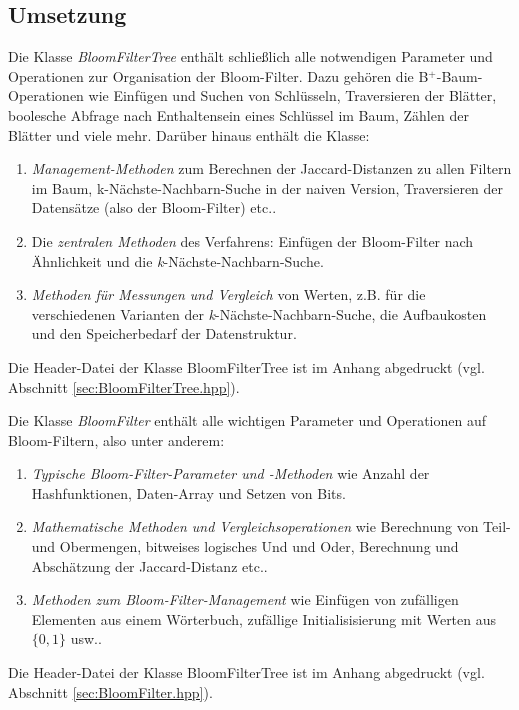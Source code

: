 \subsection{Umsetzung}\label{sec:umsetzung}
Die Klasse \textit{BloomFilterTree} enthält schließlich alle notwendigen Parameter und Operationen zur Organisation der Bloom-Filter. Dazu gehören die B$^+$-Baum-Operationen wie Einfügen und Suchen von Schlüsseln, Traversieren der Blätter, boolesche Abfrage nach Enthaltensein eines Schlüssel im Baum, Zählen der Blätter und viele mehr. Darüber hinaus enthält die Klasse:  
\begin{enumerate}
	\item \textit{Management-Methoden} zum Berechnen der Jaccard-Distanzen zu allen Filtern im Baum, k-Nächste-Nachbarn-Suche in der naiven Version, Traversieren der Datensätze (also der Bloom-Filter) etc..
	\item Die \textit{zentralen Methoden} des Verfahrens: Einfügen der Bloom-Filter nach Ähnlichkeit und die \textit{k}-Nächste-Nachbarn-Suche. 
	\item \textit{Methoden für Messungen und Vergleich} von Werten, z.B. für die verschiedenen Varianten der \textit{k}-Nächste-Nachbarn-Suche, die Aufbaukosten und den Speicherbedarf der Datenstruktur. 
\end{enumerate}
Die Header-Datei der Klasse BloomFilterTree ist im Anhang abgedruckt (vgl. Abschnitt \ref{sec:BloomFilterTree.hpp}).

Die Klasse \textit{BloomFilter} enthält alle wichtigen Parameter und Operationen auf Bloom-Filtern, also unter anderem: 
\begin{enumerate}
	\item \textit{Typische Bloom-Filter-Parameter und -Methoden} wie Anzahl der Hashfunktionen, Daten-Array und Setzen von Bits.
	\item \textit{Mathematische Methoden und Vergleichsoperationen} wie Berechnung von Teil- und Obermengen, bitweises logisches Und und Oder, Berechnung und Abschätzung der Jaccard-Distanz etc..
	\item \textit{Methoden zum Bloom-Filter-Management} wie Einfügen von zufälligen Elementen aus einem Wörterbuch, zufällige Initialisisierung mit Werten aus $\{0,1\}$ usw..
\end{enumerate}
Die Header-Datei der Klasse BloomFilterTree ist im Anhang abgedruckt (vgl. Abschnitt \ref{sec:BloomFilter.hpp}).

